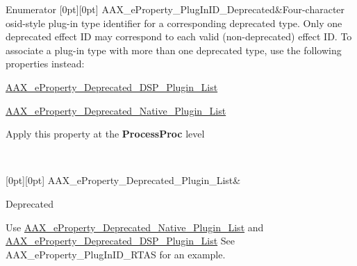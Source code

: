 \begin{DoxyEnumFields}{Enumerator}
[0pt][0pt]{}\mbox{\label{a00662_a13e384f22825afd3db6d68395b79ce0dadb254df9b6114516beed7a04675a22a3}} 
A\+A\+X\+\_\+e\+Property\+\_\+\+Plug\+In\+I\+D\+\_\+\+Deprecated&Four-\/character osid-\/style plug-\/in type identifier for a corresponding deprecated type. Only one deprecated effect ID may correspond to each valid (non-\/deprecated) effect ID. To associate a plug-\/in type with more than one deprecated type, use the following properties instead\+:
\begin{DoxyItemize}
\item \mbox{\hyperlink{a00662_a13e384f22825afd3db6d68395b79ce0dab102bc794f2770c14b1f0fe2dde6766a}{A\+A\+X\+\_\+e\+Property\+\_\+\+Deprecated\+\_\+\+D\+S\+P\+\_\+\+Plugin\+\_\+\+List}}
\item \mbox{\hyperlink{a00662_a13e384f22825afd3db6d68395b79ce0da3f1e690c987d601001a7cc1da8247399}{A\+A\+X\+\_\+e\+Property\+\_\+\+Deprecated\+\_\+\+Native\+\_\+\+Plugin\+\_\+\+List}}
\end{DoxyItemize}

\begin{DoxyItemize}
\item Apply this property at the {\bfseries{Process\+Proc}} level \end{DoxyItemize}
\\
\hline

[0pt][0pt]{}\mbox{\label{a00662_a13e384f22825afd3db6d68395b79ce0da2414ef0c66df40f47ec8f8092de3b94a}} 
A\+A\+X\+\_\+e\+Property\+\_\+\+Deprecated\+\_\+\+Plugin\+\_\+\+List&\begin{DoxyRefDesc}{Deprecated}
\item[\mbox{\hyperlink{a00788__deprecated000016}{Deprecated}}]Use \mbox{\hyperlink{a00662_a13e384f22825afd3db6d68395b79ce0da3f1e690c987d601001a7cc1da8247399}{A\+A\+X\+\_\+e\+Property\+\_\+\+Deprecated\+\_\+\+Native\+\_\+\+Plugin\+\_\+\+List}} and \mbox{\hyperlink{a00662_a13e384f22825afd3db6d68395b79ce0dab102bc794f2770c14b1f0fe2dde6766a}{A\+A\+X\+\_\+e\+Property\+\_\+\+Deprecated\+\_\+\+D\+S\+P\+\_\+\+Plugin\+\_\+\+List}} See A\+A\+X\+\_\+e\+Property\+\_\+\+Plug\+In\+I\+D\+\_\+\+R\+T\+AS for an example. \end{DoxyRefDesc}
\\
\hline


\end{DoxyEnumFields}
